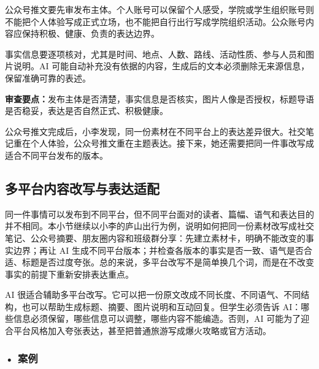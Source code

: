 \begin{critiquebox}
公众号推文要先审发布主体。个人账号可以保留个人感受，学院或学生组织账号则不能把个人体验写成正式立场，也不能把自行出行写成学院组织活动。公众账号内容应保持积极、健康、负责的表达边界\footnotemark。

事实信息要逐项核对，尤其是时间、地点、人数、路线、活动性质、参与人员和图片说明。AI 可能自动补充没有依据的内容，生成后的文本必须删除无来源信息，保留准确可靠的表述\footnotemark。

\textbf{审查要点：}发布主体是否清楚，事实信息是否核实，图片人像是否授权，标题导语是否稳妥，表达是否自然正式、积极健康。
\end{critiquebox}
\addtocounter{footnote}{-2}



公众号推文完成后，小李发现，同一份素材在不同平台上的表达差异很大。社交笔记重在个人体验，公众号推文重在主题表达。接下来，她还需要把同一件事改写成适合不同平台发布的版本。


\subsection{多平台内容改写与表达适配}

同一件事情可以发布到不同平台，但不同平台面对的读者、篇幅、语气和表达目的并不相同。本小节继续以小李的庐山出行为例，说明如何把同一份素材改写成社交笔记、公众号摘要、朋友圈内容和班级群分享：先建立素材卡，明确不能改变的事实边界；再让 AI 生成不同平台版本；并检查各版本的事实是否一致、语气是否合适、标题是否过度夸张。总的来说，多平台改写不是简单换几个词，而是在不改变事实的前提下重新安排表达重点。


AI 很适合辅助多平台改写。它可以把一份原文改成不同长度、不同语气、不同结构，也可以帮助生成标题、摘要、图片说明和互动回复。但学生必须告诉 AI：哪些信息必须保留，哪些信息可以调整，哪些内容不能编造。否则，AI 可能为了迎合平台风格加入夸张表达，甚至把普通旅游写成爆火攻略或官方活动。

\subsubsection*{\textbf{• 案例}}

